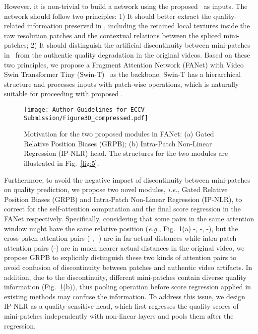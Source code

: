 \documentclass[runningheads]{llncs}
\begin{document}
However, it is non-trivial to build a network using the proposed \frag~as inputs. The network should follow two principles: 1) It should better extract the quality-related information preserved in \frag, including the retained local textures inside the raw resolution patches and the contextual relations between the spliced mini-patches; 2) It should distinguish the artificial discontinuity between mini-patches in \frag~from the authentic quality degradation in the original videos. Based on these two principles, we propose a Fragment Attention Network (FANet) with Video Swin Transformer Tiny (Swin-T)~\cite{swin3d}  as the backbone. Swin-T has a hierarchical structure and processes inputs with patch-wise operations, which is naturally suitable for proceeding with proposed \frag.

\begin{figure}[]
    \centering
    \texttt{[image: Author Guidelines for ECCV Submission/Figure3D\_compressed.pdf]}
    \vspace{-5pt}
    \caption{Motivation for the two proposed modules in FANet: (a) Gated Relative Position Biases (GRPB); (b) Intra-Patch Non-Linear Regression (IP-NLR) head. The structures for the two modules are illustrated in Fig.~\ref{fig:5}.}
    \label{fig:3}
    \vspace{-18pt}
\end{figure}

Furthermore, to avoid the negative impact of discontinuity between mini-patches on quality prediction, we propose two novel modules, \emph{i.e.}, Gated Relative Position Biases (GRPB) and Intra-Patch Non-Linear Regression (IP-NLR), to correct for the self-attention computation and the final score regression in the FANet respectively. Specifically, considering that some pairs in the same attention window might have the same relative position (\textit{e.g.}, Fig.~\ref{fig:3}(a) -, -, -), 
but the cross-patch attention pairs (-, -) are in far actual distances while intra-patch attention pairs (-) are in much nearer actual distances in the original video, we propose GRPB to explicitly distinguish these two kinds of attention pairs to avoid confusion of discontinuity between patches and authentic video artifacts. In addition, due to the discontinuity, different mini-patches contain diverse quality information (Fig.~\ref{fig:3}(b)), thus pooling operation before score regression applied in existing methods may confuse the information. To address this issue, we design IP-NLR as a quality-sensitive head, which first regresses the quality scores of mini-patches independently with non-linear layers and pools them after the regression.
\end{document}
